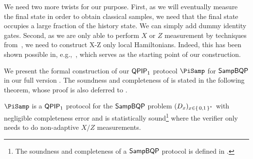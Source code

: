 We need two more twists for our purpose.
First, as we will eventually measure the final state in order to obtain classical samples, we need that the final state occupies a large fraction of the history state. We can simply add dummy identity gates.
Second, as we are only able to perform $X$ or $Z$ measurement by techniques from~\cite{FOCS:Mahadev18a},
we need to construct X-Z only local Hamiltonians.
Indeed, this has been shown possible in, e.g.,~\cite{PhysRevA.78.012352}, which serves as the starting point of our construction.


We present the formal construction of our $\operatorname{\mathsf{QPIP}}_1$ protocol $\PiSamp$ for $\operatorname{\mathsf{SampBQP}}$ in our full version \cite{full-version}. The soundness and completeness of  is stated in the following theorem, whose proof is also deferred to \cite{full-version}.%



\begin{thm}
    \label{QPIP1thm}
	$\PiSamp$ is a $\operatorname{\mathsf{QPIP}}_1$ protocol for the $\operatorname{\mathsf{SampBQP}}$ problem  $(D_x)_{x\in\set{0,1}^*}$ with negligible completeness error and is statistically sound\footnote{The soundness and completeness of a $\operatorname{\mathsf{SampBQP}}$ protocol is defined in .} where the verifier only needs to do non-adaptive $X/Z$ measurements.
\end{thm}

\vspace{-3pt}